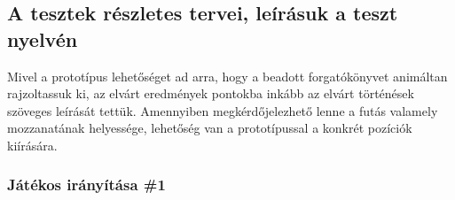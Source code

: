 \newpage

\subsection{A tesztek részletes tervei, leírásuk a teszt nyelvén}

Mivel a prototípus lehetőséget ad arra, hogy a beadott forgatókönyvet animáltan rajzoltassuk ki, az elvárt eredmények pontokba inkább az elvárt történések szöveges leírását tettük. Amennyiben megkérdőjelezhető lenne a futás valamely mozzanatának helyessége, lehetőség van a prototípussal a konkrét pozíciók kiírására.

\subsubsection{Játékos irányítása \#1}
